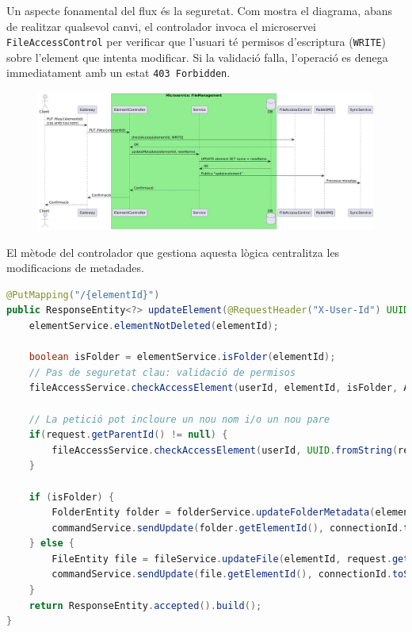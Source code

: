Un aspecte fonamental del flux és la seguretat. Com mostra el diagrama, abans de realitzar qualsevol canvi, el controlador invoca el microservei \texttt{FileAccessControl} per verificar que l'usuari té permisos d'escriptura (\texttt{WRITE}) sobre l'element que intenta modificar. Si la validació falla, l'operació es denega immediatament amb un estat \texttt{403 Forbidden}.

\begin{figure}[H]
    \centering
    \includegraphics[width=1\textwidth]{Figures/flux/rename_files.png}
\end{figure}

El mètode del controlador que gestiona aquesta lògica centralitza les modificacions de metadades.

\begin{lstlisting}[language=Java, caption={Endpoint per a l'actualització de metadades a `ElementController`}]
@PutMapping("/{elementId}")
public ResponseEntity<?> updateElement(@RequestHeader("X-User-Id") UUID userId, @RequestHeader("X-Connection-Id") UUID connectionId, @RequestBody UpdateFileRequest request, @PathVariable("elementId") UUID elementId) {
    elementService.elementNotDeleted(elementId);
    
    boolean isFolder = elementService.isFolder(elementId);
    // Pas de seguretat clau: validació de permisos
    fileAccessService.checkAccessElement(userId, elementId, isFolder, AccessType.WRITE);
    
    // La petició pot incloure un nou nom i/o un nou pare
    if(request.getParentId() != null) {
        fileAccessService.checkAccessElement(userId, UUID.fromString(request.getParentId()), true, AccessType.WRITE);
    }

    if (isFolder) {
        FolderEntity folder = folderService.updateFolderMetadata(elementId, request.getName(), UUID.fromString(request.getParentId()));
        commandService.sendUpdate(folder.getElementId(), connectionId.toString(), userId.toString(), folder.getParent(), "", folder.getName(), "folder");
    } else {
        FileEntity file = fileService.updateFile(elementId, request.getName(), UUID.fromString(request.getParentId()));
        commandService.sendUpdate(file.getElementId(), connectionId.toString(), userId.toString(), file.getParent(), fileService.getHash(file.getId()), file.getName(), "file");
    }
    return ResponseEntity.accepted().build();
}
\end{lstlisting}


